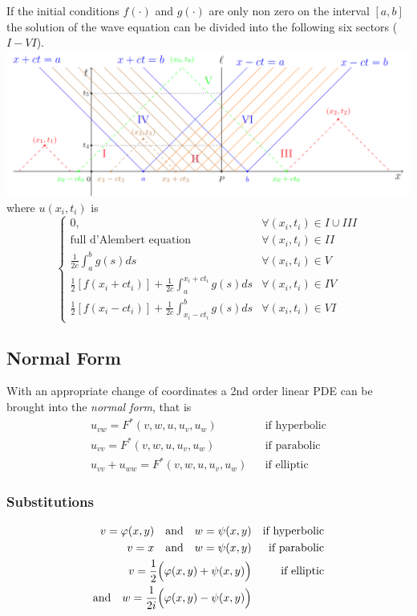 If the initial conditions $f(\cdot)$ and $g(\cdot)$ are only non zero on the interval $[a,b]$ the solution of the wave equation can be divided into the following six sectors ($I-VI$).
\includegraphics[width=\linewidth]{../images/pde_dAlembert.png}
where $u(x_i,t_i)$ is
\begin{equation*}
    \begin{cases}
        0,                                                                        & \forall (x_i,t_i) \in I \cup III \\
        \text{full d'Alembert equation}                                           & \forall (x_i,t_i) \in II         \\
        \frac{1}{2c}\int_{a}^{b}g(s)ds                                            & \forall (x_i,t_i) \in V          \\
        \frac{1}{2}\left[f(x_i+ct_i)\right]+\frac{1}{2c}\int_{a}^{x_i+ct_i}g(s)ds & \forall (x_i,t_i) \in IV         \\
        \frac{1}{2}\left[f(x_i-ct_i)\right]+\frac{1}{2c}\int_{x_i-ct_i}^{b}g(s)ds & \forall (x_i,t_i) \in VI
    \end{cases}
\end{equation*}


\subsection{Normal Form}
With an appropriate change of coordinates a 2nd order linear PDE can be brought into the \textit{normal form}, that is
\begin{align*}
    u_{vw}=F^{*}(v,w,u,u_{v},u_{w})        &  & \text{if hyperbolic} \\
    u_{vv}=F^{*}(v,w,u,u_{v},u_{w})        &  & \text{if parabolic}  \\
    u_{vv}+u_{ww}=F^{*}(v,w,u,u_{v},u_{w}) &  & \text{if elliptic}
\end{align*}

\subsubsection{Substitutions}
\begin{align*}
    v=\varphi(x,y)\quad\text{and}\quad w=\psi(x,y)                   &   & \text{if hyperbolic} \\
    v=x\quad\text{and}\quad w=\psi(x,y)                              &   & \text{if parabolic}  \\
    v=\frac{1}{2}\Bigl(\varphi(x,y)+\psi(x,y)\Bigr)                  &   & \text{if elliptic}   \\
    \text{and}\quad w=\frac{1}{2i}\Bigl(\varphi(x,y)-\psi(x,y)\Bigr) &
\end{align*}

